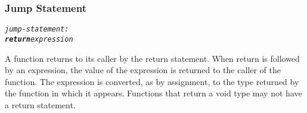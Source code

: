 \documentclass[12pt]{report}
\begin{document}
\subsubsection{Jump Statement}
\begin{alltt}
         \textit{jump-statement:}
              \textit{\textbf{return} expression}
\end{alltt}
\begin{doublespace}
A function returns to its caller by the return statement. When return is followed by an expression, the value of the expression is returned to the caller of the function. The expression is converted, as by assignment, to the type returned by the function in which it appears. Functions that return a void type may not have a return statement.
\end{doublespace}
\end{document}
